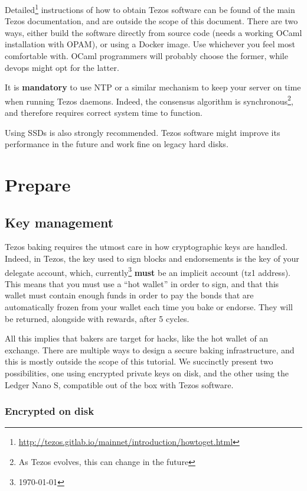 \documentclass[a4paper,twocolumn,10pt]{article}
\begin{document}
Detailed\footnote{\url{http://tezos.gitlab.io/mainnet/introduction/howtoget.html}}
instructions of how to obtain Tezos software can be found of the main
Tezos documentation, and are outside the scope of this document. There
are two ways, either build the software directly from source code
(needs a working OCaml installation with OPAM), or using a Docker
image. Use whichever you feel most comfortable with. OCaml programmers
will probably choose the former, while devops might opt for the
latter.

It is \textbf{mandatory} to use NTP or a similar mechanism to keep
your server on time when running Tezos daemons. Indeed, the consensus
algorithm is synchronous\footnote{As Tezos evolves, this can change in
  the future}, and therefore requires correct system time to function.

Using SSDs is also strongly recommended. Tezos software might improve
its performance in the future and work fine on legacy hard disks.


\section{Prepare}
\subsection{Key management}

Tezos baking requires the utmost care in how cryptographic keys are
handled. Indeed, in Tezos, the key used to sign blocks and
endorsements is the key of your delegate account, which,
currently\footnote{\today} \textbf{must} be an implicit account (tz1
address). This means that you must use a “hot wallet” in order to
sign, and that this wallet must contain enough funds in order to pay
the bonds that are automatically frozen from your wallet each time you
bake or endorse. They will be returned, alongside with rewards, after
5 cycles.

All this implies that bakers are target for hacks, like the hot wallet
of an exchange. There are multiple ways to design a secure baking
infrastructure, and this is mostly outside the scope of this
tutorial. We succinctly present two possibilities, one using encrypted private
keys on disk, and the other using the Ledger Nano S, compatible out of
the box with Tezos software.

\subsubsection{Encrypted on disk}
\end{document}
